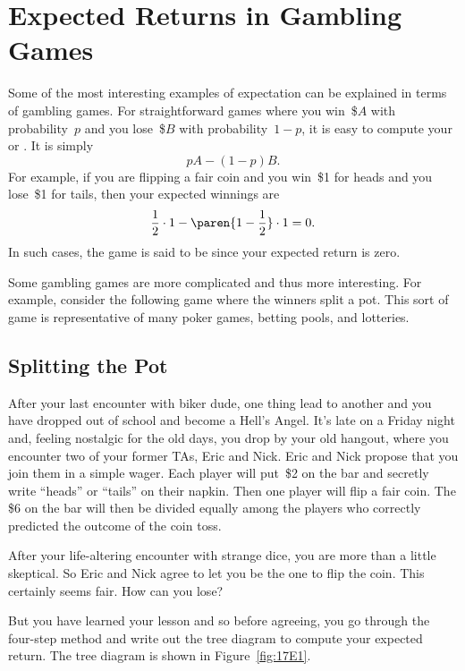 \section{Expected Returns in Gambling Games}

Some of the most interesting examples of expectation can be explained
in terms of gambling games.  For straightforward games where you
win~\$$A$ with probability~$p$ and you lose~\$$B$ with probability~$1 -
p$, it is easy to compute your  or
.  It is simply
\begin{equation*}
    p A - (1 - p) B.
\end{equation*}
For example, if you are flipping a fair coin and you win~\$1 for heads
and you lose~\$1 for tails, then your expected winnings are
\begin{equation*}
    \frac{1}{2} \cdot 1 - \paren{1 - \frac{1}{2}} \cdot 1 = 0.
\end{equation*}
In such cases, the game is said to be  since your expected
return is zero.

Some gambling games are more complicated and thus more interesting.
For example, consider the following game where the winners split a
pot.  This sort of game is representative of many poker games, betting
pools, and lotteries.

\subsection{Splitting the Pot}

After your last encounter with biker dude, one thing lead to another
and you have dropped out of school and become a Hell's Angel.  It's
late on a Friday night and, feeling nostalgic for the old days, you
drop by your old hangout, where you encounter two of your former TAs,
Eric and Nick.  Eric and Nick propose that you join them in a simple
wager. Each player will put~\$2 on the bar and secretly write
``heads'' or ``tails'' on their napkin.  Then one player will flip a
fair coin.   The \$6 on the bar will then be divided
equally among the players who correctly predicted the outcome of the
coin toss.

After your life-altering encounter with strange dice, you are more
than a little skeptical.  So Eric and Nick agree to let you be the one
to flip the coin.  This certainly seems fair.  How can you lose?

But you have learned your lesson and so before agreeing, you go
through the four-step method and write out the tree diagram to compute
your expected return.  The tree diagram is shown in
Figure~\ref{fig:17E1}.

